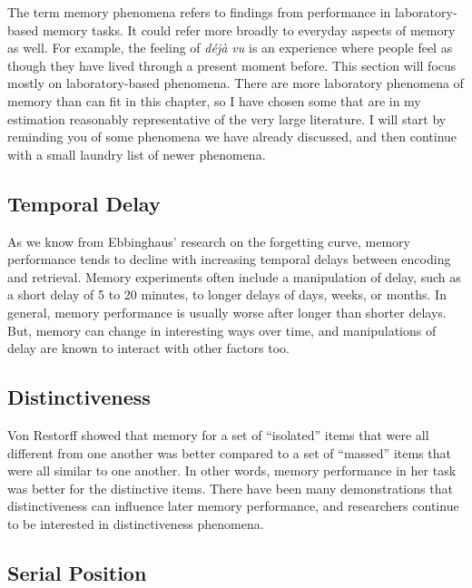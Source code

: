 \documentclass[
  oneside,
  12pt]{crumpbook}
\begin{document}
The term memory phenomena refers to findings from performance in laboratory-based memory tasks. It could refer more broadly to everyday aspects of memory as well. For example, the feeling of \emph{déjà vu} is an experience where people feel as though they have lived through a present moment before. This section will focus mostly on laboratory-based phenomena. There are more laboratory phenomena of memory than can fit in this chapter, so I have chosen some that are in my estimation reasonably representative of the very large literature. I will start by reminding you of some phenomena we have already discussed, and then continue with a small laundry list of newer phenomena.

\hypertarget{temporal-delay}{%
\subsection{Temporal Delay}\label{temporal-delay}}

As we know from Ebbinghaus' research on the forgetting curve, memory performance tends to decline with increasing temporal delays between encoding and retrieval. Memory experiments often include a manipulation of delay, such as a short delay of 5 to 20 minutes, to longer delays of days, weeks, or months. In general, memory performance is usually worse after longer than shorter delays. But, memory can change in interesting ways over time, and manipulations of delay are known to interact with other factors too.

\hypertarget{distinctiveness}{%
\subsection{Distinctiveness}\label{distinctiveness}}

Von Restorff showed that memory for a set of ``isolated'' items that were all different from one another was better compared to a set of ``massed'' items that were all similar to one another. In other words, memory performance in her task was better for the distinctive items. There have been many demonstrations that distinctiveness can influence later memory performance, and researchers continue to be interested in distinctiveness phenomena.

\hypertarget{serial-position}{%
\subsection{Serial Position}\label{serial-position}}
\end{document}
